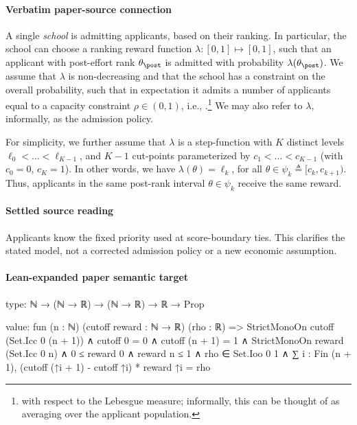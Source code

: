 \documentclass[10pt]{article}
\begin{document}
\paragraph{Verbatim paper-source connection}
\begin{ReviewVerbatim}
 A single \textit{school} is admitting applicants, based on their ranking. In particular, the school can choose a ranking reward function $\lambda : [0, 1] \mapsto [0, 1]$, such that an applicant with post-effort rank $\theta_\post$ is admitted with probability $\lambda(\theta_\post)$. We assume that $\lambda$ is non-decreasing and that the school has a constraint on the overall probability, such that in expectation it admits a number of applicants equal to {a} capacity constraint  $\rho \in (0,1)$, i.e., \lledit{$\E_{\theta_\post}[\lambda(\theta_\post)] = \rho $}.\footnote{ with respect to the Lebesgue measure; informally, this can be thought of as averaging over the applicant population.} We may also refer to $\lambda$, informally, as the admission policy.



For simplicity, we further assume that $\lambda$ is a step-function with $K$ distinct levels $\ell_0 < \dots < \ell_{K-1}$, and $K-1$ cut-points parameterized by $c_1< \dots < c_{K-1}$ (with $c_0 = 0$, $c_K = 1$). %
In other words, we have $\lambda(\theta) = \ell_k$, for all $\theta \in \psi_k \triangleq [c_{k}, c_{k+1})$. Thus, applicants in the same post-rank interval $\theta \in \psi_k$ receive the same reward.
\end{ReviewVerbatim}

\paragraph{Settled source reading}
\begin{sloppypar}
Applicants know the fixed priority used at score-\allowbreak{}boundary ties.\allowbreak{} This clarifies the stated model, not a corrected admission policy or a new economic assumption.\allowbreak{}
\end{sloppypar}

\paragraph{Lean-expanded paper semantic target}
\begin{ReviewVerbatim}
type:
ℕ → (ℕ → ℝ) → (ℕ → ℝ) → ℝ → Prop

value:
fun (n : ℕ) (cutoff reward : ℕ → ℝ) (rho : ℝ) =>
  StrictMonoOn cutoff (Set.Icc 0 (n + 1)) ∧
    cutoff 0 = 0 ∧
      cutoff (n + 1) = 1 ∧
        StrictMonoOn reward (Set.Icc 0 n) ∧
          0 ≤ reward 0 ∧
            reward n ≤ 1 ∧ rho ∈ Set.Ioo 0 1 ∧ ∑ i : Fin (n + 1), (cutoff (↑i + 1) - cutoff ↑i) * reward ↑i = rho
\end{ReviewVerbatim}
\end{document}
